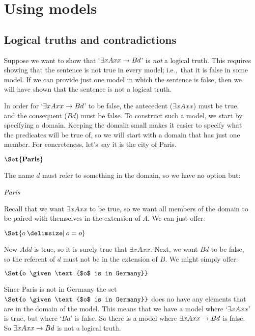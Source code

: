 \chapter{Using models}
\label{sec.UsingModels}

\section{Logical truths and contradictions}
Suppose we want to show that `$\exists xAxx \rightarrow Bd$' is \emph{not} a logical truth. This requires showing that the sentence is not true in every model; i.e.,\ that it is false in some model. If we can provide just one model in which the sentence is false, then we will have shown that the sentence is not a logical truth.

In order for `$\exists xAxx \rightarrow Bd$' to be false, the antecedent ($\exists x Axx$) must be true, and the consequent ($Bd$) must be false. To construct such a model, we start by specifying a domain. Keeping the domain small makes it easier to specify what the predicates will be true of, so we will start with a domain that has just one member. For concreteness, let's say it is the city of Paris.
	\begin{interp}
		\item[\domain] $\Set{\emph{Paris}}$
	\end{interp}
The name $d$ must refer to something in the domain, so we have no option but:
	\begin{interp}
		\item[\denote{d}] \emph{Paris}
	\end{interp}
Recall that we want $\exists x Axx$ to be true, so we want all members of the domain to be paired with themselves in the extension of $A$. We can just offer:
	\begin{interp}
		\item[\denote{A}] $\Set{o \given  o=o}$
	\end{interp}
Now $Add$ is true, so it is surely true that $\exists x Axx$. Next, we want $Bd$ to be false, so the referent of $d$ must not be in the extension of $B$. We might simply offer:
	\begin{interp}
		\item[\denote{B}] $\Set{o \given \text{$o$ is in Germany}}$
	\end{interp}
Since Paris is not in Germany the set $\Set{o \given \text{$o$ is in Germany}}$ does no have any elements that are in the domain of the model. This means that we have a model where `$\exists x Axx$' is true, but where `$Bd$' is false. So there is a model where $\exists x Axx \rightarrow Bd$ is false. So $\exists x Axx \rightarrow Bd$ is not a logical truth.

